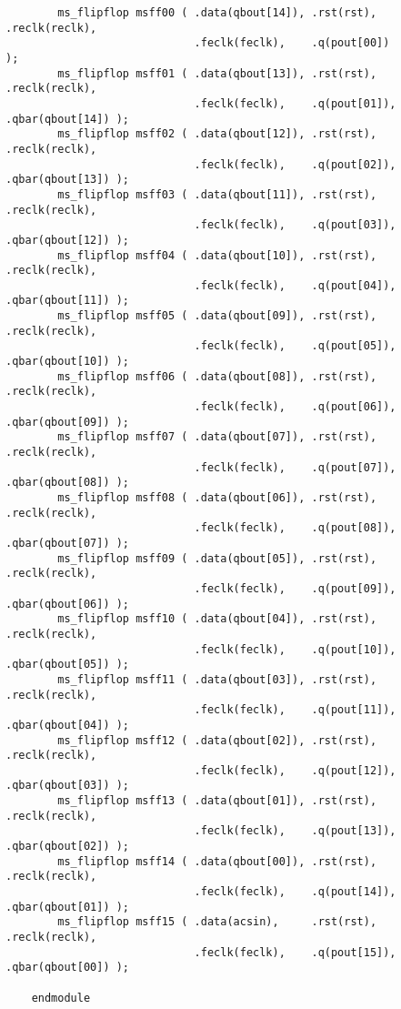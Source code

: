 \documentclass[../main]{subfiles}
\begin{document}
\begin{verbatim}
        ms_flipflop msff00 ( .data(qbout[14]), .rst(rst),    .reclk(reclk),
                             .feclk(feclk),    .q(pout[00])                   );
        ms_flipflop msff01 ( .data(qbout[13]), .rst(rst),    .reclk(reclk),
                             .feclk(feclk),    .q(pout[01]), .qbar(qbout[14]) );
        ms_flipflop msff02 ( .data(qbout[12]), .rst(rst),    .reclk(reclk),
                             .feclk(feclk),    .q(pout[02]), .qbar(qbout[13]) );
        ms_flipflop msff03 ( .data(qbout[11]), .rst(rst),    .reclk(reclk),
                             .feclk(feclk),    .q(pout[03]), .qbar(qbout[12]) );
        ms_flipflop msff04 ( .data(qbout[10]), .rst(rst),    .reclk(reclk),
                             .feclk(feclk),    .q(pout[04]), .qbar(qbout[11]) );
        ms_flipflop msff05 ( .data(qbout[09]), .rst(rst),    .reclk(reclk),
                             .feclk(feclk),    .q(pout[05]), .qbar(qbout[10]) );
        ms_flipflop msff06 ( .data(qbout[08]), .rst(rst),    .reclk(reclk),
                             .feclk(feclk),    .q(pout[06]), .qbar(qbout[09]) );
        ms_flipflop msff07 ( .data(qbout[07]), .rst(rst),    .reclk(reclk),
                             .feclk(feclk),    .q(pout[07]), .qbar(qbout[08]) );
        ms_flipflop msff08 ( .data(qbout[06]), .rst(rst),    .reclk(reclk),
                             .feclk(feclk),    .q(pout[08]), .qbar(qbout[07]) );
        ms_flipflop msff09 ( .data(qbout[05]), .rst(rst),    .reclk(reclk),
                             .feclk(feclk),    .q(pout[09]), .qbar(qbout[06]) );
        ms_flipflop msff10 ( .data(qbout[04]), .rst(rst),    .reclk(reclk),
                             .feclk(feclk),    .q(pout[10]), .qbar(qbout[05]) );
        ms_flipflop msff11 ( .data(qbout[03]), .rst(rst),    .reclk(reclk),
                             .feclk(feclk),    .q(pout[11]), .qbar(qbout[04]) );
        ms_flipflop msff12 ( .data(qbout[02]), .rst(rst),    .reclk(reclk),
                             .feclk(feclk),    .q(pout[12]), .qbar(qbout[03]) );
        ms_flipflop msff13 ( .data(qbout[01]), .rst(rst),    .reclk(reclk),
                             .feclk(feclk),    .q(pout[13]), .qbar(qbout[02]) );
        ms_flipflop msff14 ( .data(qbout[00]), .rst(rst),    .reclk(reclk),
                             .feclk(feclk),    .q(pout[14]), .qbar(qbout[01]) );
        ms_flipflop msff15 ( .data(acsin),     .rst(rst),    .reclk(reclk),
                             .feclk(feclk),    .q(pout[15]), .qbar(qbout[00]) );

    endmodule
\end{verbatim}
\end{document}
